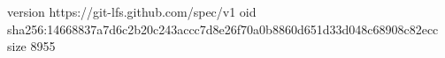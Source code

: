 version https://git-lfs.github.com/spec/v1
oid sha256:14668837a7d6c2b20c243accc7d8e26f70a0b8860d651d33d048c68908c82ecc
size 8955
